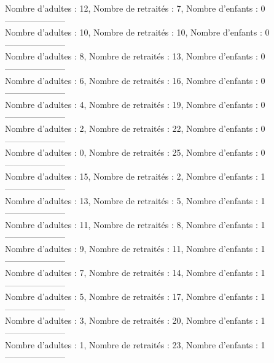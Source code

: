 \documentclass[10pt,a4paper]{article}
\begin{document}
Nombre d'adultes : 12, Nombre de retraités : 7, Nombre d'enfants : 0\\
---------------------\\
Nombre d'adultes : 10, Nombre de retraités : 10, Nombre d'enfants : 0\\
---------------------\\
Nombre d'adultes : 8, Nombre de retraités : 13, Nombre d'enfants : 0\\
---------------------\\
Nombre d'adultes : 6, Nombre de retraités : 16, Nombre d'enfants : 0\\
---------------------\\
Nombre d'adultes : 4, Nombre de retraités : 19, Nombre d'enfants : 0\\
---------------------\\
Nombre d'adultes : 2, Nombre de retraités : 22, Nombre d'enfants : 0\\
---------------------\\
Nombre d'adultes : 0, Nombre de retraités : 25, Nombre d'enfants : 0\\
---------------------\\
Nombre d'adultes : 15, Nombre de retraités : 2, Nombre d'enfants : 1\\
---------------------\\
Nombre d'adultes : 13, Nombre de retraités : 5, Nombre d'enfants : 1\\
---------------------\\
Nombre d'adultes : 11, Nombre de retraités : 8, Nombre d'enfants : 1\\
---------------------\\
Nombre d'adultes : 9, Nombre de retraités : 11, Nombre d'enfants : 1\\
---------------------\\
Nombre d'adultes : 7, Nombre de retraités : 14, Nombre d'enfants : 1\\
---------------------\\
Nombre d'adultes : 5, Nombre de retraités : 17, Nombre d'enfants : 1\\
---------------------\\
Nombre d'adultes : 3, Nombre de retraités : 20, Nombre d'enfants : 1\\
---------------------\\
Nombre d'adultes : 1, Nombre de retraités : 23, Nombre d'enfants : 1\\
---------------------\\
\end{document}
